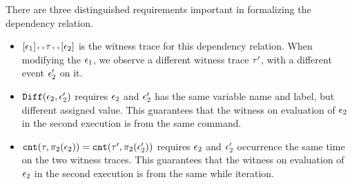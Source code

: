 There are three distinguished requirements
important in formalizing the 
dependency relation.
\begin{itemize}
\item $[\mathtt{\epsilon}_1 ] {\scriptscriptstyle ++} \mathtt{\tau} {\scriptscriptstyle ++} [\mathtt{\epsilon}_2]$ is the witness trace for this dependency relation. When 
modifying the $\mathtt{\epsilon}_1$, we observe a different witness trace $\mathtt{\tau}'$, with a different event $\mathtt{\epsilon}_2'$ on it.

\item $\mathtt{Diff}(\mathtt{\epsilon}_2, \mathtt{\epsilon}_2')$ requires $\mathtt{\epsilon}_2$ and $\mathtt{\epsilon}_2'$ has the same variable name and label, but different assigned value.
This guarantees that the witness on evaluation of $\mathtt{\epsilon}_2$ in the second execution is 
from the same command.
\item $\mathtt{cnt}(\mathtt{\tau}, \pi_2(\mathtt{\epsilon}_2))
= 
\mathtt{cnt}(\mathtt{\tau}', \pi_2(\mathtt{\epsilon}_2'))$ requires $\mathtt{\epsilon}_2$ and $\mathtt{\epsilon}_2'$ occurrence the same time on the two witness traces.
This guarantees that the witness on evaluation of $\mathtt{\epsilon}_2$ in the second execution is 
from the same while iteration.
\end{itemize}
